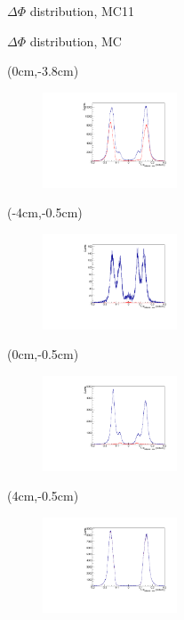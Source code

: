\documentclass[10pt]{beamer}
\begin{document}
{\begin{frame}{$\Delta \Phi$ distribution, MC11}
\begin{textblock*}{0.5\textwidth}
\begin{itemize}
		\end{itemize}
	\end{textblock*}
	

\end{frame}




	

\begin{frame}{$\Delta \Phi$ distribution, MC}
	
	\begin{textblock*}{\textwidth}(0cm,-3.8cm)
		\begin{figure}
			\includegraphics[width=4cm]{Plots/isSignalDeltaPhi}
		
		\end{figure}
	\end{textblock*}

\begin{textblock*}{\textwidth}(-4cm,-0.5cm)
	\begin{figure}
		\includegraphics[width=4cm]{Plots/MCgg}
	\end{figure}
	
\end{textblock*}


\begin{textblock*}{\textwidth}(0cm,-0.5cm)
	\begin{figure}
		\includegraphics[width=4cm]{Plots/MCeg}
	\end{figure}
	
	\end{textblock*}	

\begin{textblock*}{\textwidth}(4cm,-0.5cm)
	\begin{figure}
		\includegraphics[width=4cm]{Plots/MCee}
	\end{figure}
	

\end{textblock*}
\end{frame}}
\end{document}
